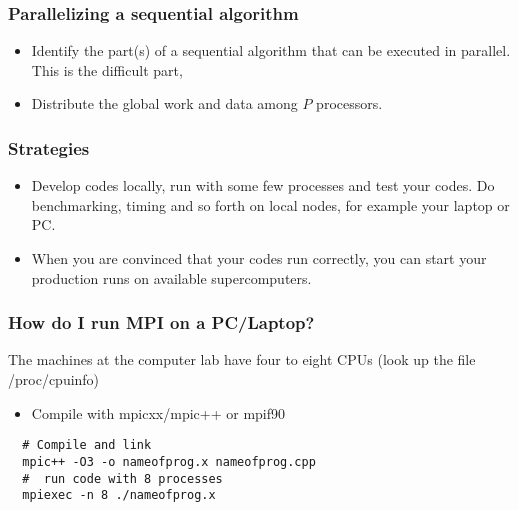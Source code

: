 \documentclass{beamer}
\begin{document}
\begin{frame}
\frametitle{Parallelizing a sequential algorithm}

\begin{block}{}

\begin{itemize}
\item Identify the part(s) of a sequential algorithm that can be  executed in parallel. This is the difficult part,

\item Distribute the global work and data among $P$ processors.
\end{itemize}

\noindent
\end{block}
\end{frame}

\begin{frame}
\frametitle{Strategies}

\begin{block}{}
\begin{itemize}
\item Develop codes locally, run with some few processes and test your codes.  Do benchmarking, timing and so forth on local nodes, for example your laptop or PC. 

\item When you are convinced that your codes run correctly, you can start your production runs on available supercomputers.
\end{itemize}

\noindent
\end{block}
\end{frame}

\begin{frame}
\frametitle{How do I run MPI on a PC/Laptop?}

\begin{block}{}
The  machines at the computer lab have four to eight CPUs (look up the file /proc/cpuinfo)
\begin{itemize}
\item Compile with mpicxx/mpic++ or mpif90
\end{itemize}

\noindent
\begin{verbatim}
  # Compile and link
  mpic++ -O3 -o nameofprog.x nameofprog.cpp
  #  run code with 8 processes
  mpiexec -n 8 ./nameofprog.x
\end{verbatim}
\end{block}
\end{frame}
\end{document}
